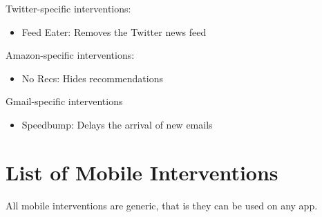 \vspace{2mm}

Twitter-specific interventions:

\begin{itemize}
    \item Feed Eater: Removes the Twitter news feed
\end{itemize}

\vspace{2mm}

Amazon-specific interventions:

\begin{itemize}
    \item No Recs: Hides recommendations
\end{itemize}

\vspace{2mm}

Gmail-specific interventions

\begin{itemize}
    \item Speedbump: Delays the arrival of new emails
\end{itemize}


\pagebreak

\section{List of Mobile Interventions}

All mobile interventions are generic, that is they can be used on any app.

